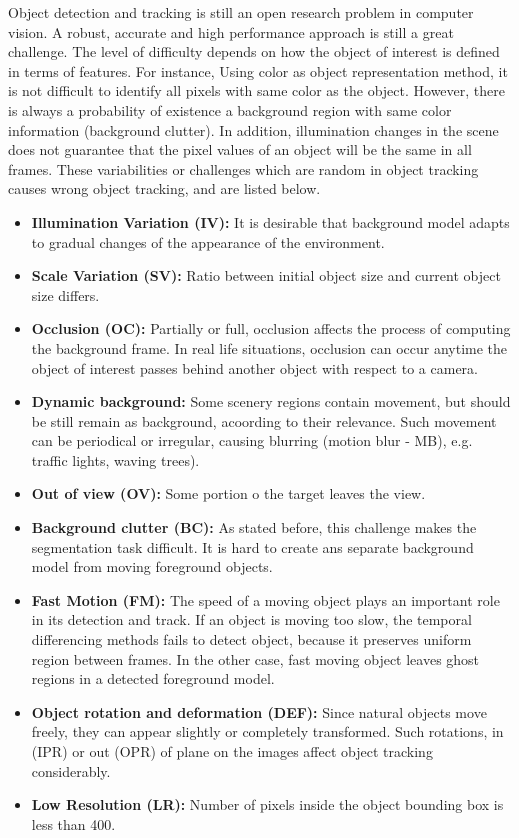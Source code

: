 Object detection and tracking is still an open research problem in computer
vision. A robust, accurate and high performance approach is still a great
challenge. The level of difficulty depends on how the object of interest is
defined in terms of features. For instance, Using color as object representation
method, it is not difficult to identify all pixels with same color as the
object. However, there is always a probability of existence a background region
with same color information (background clutter). In addition, illumination
changes in the scene does not guarantee that the pixel values of an object
will be the same in all frames. These variabilities or challenges which are
random in object tracking causes wrong object tracking, and are listed below.

\begin{itemize}
\item \textbf{Illumination Variation (IV):} It is desirable that background
model adapts to gradual changes of the appearance of the environment.
\item \textbf{Scale Variation (SV):} Ratio between initial object size and
current object size differs.
\item \textbf{Occlusion (OC):} Partially or full, occlusion affects the process
of computing the background frame. In real life situations, occlusion can occur
anytime the object of interest passes behind another object with respect to a
camera.
\item \textbf{Dynamic background:} Some scenery regions contain movement, but
should be still remain as background, acoording to their relevance. Such
movement can be periodical or irregular, causing blurring (motion blur - MB),
e.g. traffic lights, waving trees).
\item \textbf{Out of view (OV): } Some portion o the target leaves the view.
\item \textbf{Background clutter (BC):} As stated before, this challenge makes
the segmentation task difficult. It is hard to create ans separate background
model from moving foreground objects.
\item \textbf{Fast Motion (FM):} The speed of a moving object plays an
important role in its detection and track. If an object is moving too slow,
the temporal differencing methods fails to detect object, because it preserves
uniform region between frames. In the other case, fast moving object leaves
ghost regions in a detected foreground model.
\item \textbf{Object rotation and deformation (DEF):} Since natural objects
move freely, they can appear slightly or completely transformed. Such
rotations, in (IPR) or out (OPR) of plane on the images affect object tracking
considerably.
\item \textbf{Low Resolution (LR):} Number of pixels inside the object
bounding box is less than 400.
\end{itemize}

